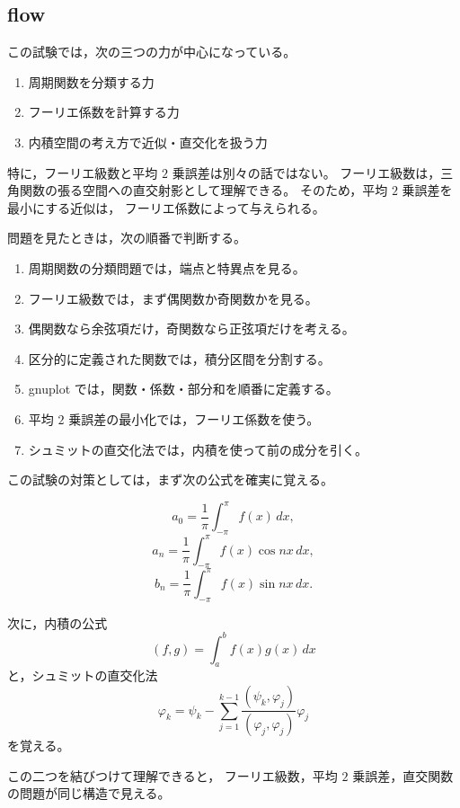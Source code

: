 \subsection{flow}

\begin{background}
	この試験では，次の三つの力が中心になっている。
	
	\begin{enumerate}
		\item 周期関数を分類する力
		\item フーリエ係数を計算する力
		\item 内積空間の考え方で近似・直交化を扱う力
	\end{enumerate}
	
	特に，フーリエ級数と平均 \(2\) 乗誤差は別々の話ではない。
	フーリエ級数は，三角関数の張る空間への直交射影として理解できる。
	そのため，平均 \(2\) 乗誤差を最小にする近似は，
	フーリエ係数によって与えられる。
\end{background}

\begin{strategy}
	問題を見たときは，次の順番で判断する。
	
	\begin{enumerate}
		\item 周期関数の分類問題では，端点と特異点を見る。
		\item フーリエ級数では，まず偶関数か奇関数かを見る。
		\item 偶関数なら余弦項だけ，奇関数なら正弦項だけを考える。
		\item 区分的に定義された関数では，積分区間を分割する。
		\item gnuplot では，関数・係数・部分和を順番に定義する。
		\item 平均 \(2\) 乗誤差の最小化では，フーリエ係数を使う。
		\item シュミットの直交化法では，内積を使って前の成分を引く。
	\end{enumerate}
	
	この試験の対策としては，まず次の公式を確実に覚える。
	
	\[
	a_0=\frac{1}{\pi}\int_{-\pi}^{\pi}f(x)\,dx,
	\]
	\[
	a_n=\frac{1}{\pi}\int_{-\pi}^{\pi}f(x)\cos nx\,dx,
	\]
	\[
	b_n=\frac{1}{\pi}\int_{-\pi}^{\pi}f(x)\sin nx\,dx.
	\]
	
	次に，内積の公式
	\[
	(f,g)=\int_a^b f(x)g(x)\,dx
	\]
	と，シュミットの直交化法
	\[
	\varphi_k
	=
	\psi_k
	-
	\sum_{j=1}^{k-1}
	\frac{(\psi_k,\varphi_j)}{(\varphi_j,\varphi_j)}
	\varphi_j
	\]
	を覚える。
	
	この二つを結びつけて理解できると，
	フーリエ級数，平均 \(2\) 乗誤差，直交関数の問題が同じ構造で見える。
\end{strategy}